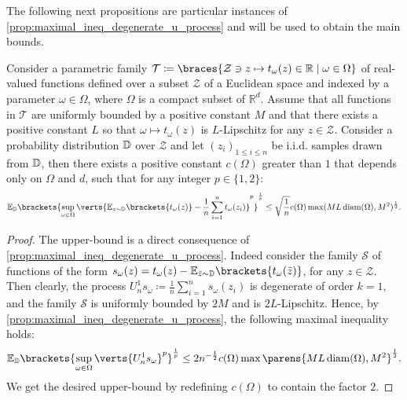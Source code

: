 The following next propositions are particular instances of \cref{prop:maximal_ineq_degenerate_u_process} and will be used to obtain the main bounds.  
\begin{proposition}\label{prop:empirical_process}
	 
	Consider a parametric family 
	$\mathcal{T}\coloneqq \braces{\mathcal{Z}\ni z\mapsto t_{\omega}(z)\in \mathbb{R}\mid\omega \in \Omega}$ 
	of real-valued functions defined over a subset $\mathcal{Z}$ of a Euclidean space and indexed by a parameter $\omega\in \Omega$, where $\Omega$ is a compact subset of $\mathbb{R}^d$. 
	Assume that all functions in $\mathcal{T}$ are uniformly bounded by a positive constant $M$ and that there exists a positive constant $L$ so that $\omega \mapsto t_{\omega}(z)$ is $L$-Lipschitz for any $z\in \mathcal{Z}$. Consider a probability distribution $\mathbb{D}$ over $\mathcal{Z}$ and let $(z_i)_{1\leq i\leq n}$ be i.i.d. samples drawn from $\mathbb{D}$, then there exists a positive constant $c(\Omega)$ greater than $1$ that depends only on $\Omega$ and $d$, such that for any integer $p \in \{1,2\}$:
	\begin{align*}
		\mathbb{E}_{\PP}\brackets{ \sup_{\omega\in \Omega} \verts{ \mathbb{E}_{z\sim \PP}\brackets{t_{\omega}(z) } - \frac{1}{n}\sum_{i=1}^n t_{\omega}(z_i) }^p }^{\frac{
		1}{p}}\leq \sqrt{\frac{1}{n}}c(\Omega)\max(ML\diam(\Omega),M^2)^{\frac{1}{2}}.
	\end{align*}
\end{proposition}
\begin{proof}
The upper-bound is a direct consequence of \cref{prop:maximal_ineq_degenerate_u_process}. Indeed consider the  family $\mathcal{S}$ of functions of the form $s_{\omega}(z) = t_{\omega}(z)-\mathbb{E}_{\bar{z}\sim\PP}\brackets{t_{\omega}(\bar{z})}$, for any $z\in\mathcal{Z}$. Then clearly, the process $U_n^1 s_{\omega}\coloneqq\frac{1}{n}\sum_{i=1}^n s_{\omega}(z_i)$ is degenerate of order $k=1$, and the family $\mathcal{S}$ is uniformly bounded by $2M$ and is $2L$-Lipschitz. Hence, by \cref{prop:maximal_ineq_degenerate_u_process}, the following maximal inequality holds:
\begin{align*}
	\mathbb{E}_{\PP}\brackets{\sup_{\omega\in \Omega} \verts{U^1_n s_{\omega}}^p}^{\frac{1}{p}}\leq 2n^{-{\frac{1}{2}}}  c(\Omega)\max\parens{ML\diam(\Omega),M^2}^{\frac{1}{2}}. 
\end{align*}
We get the desired upper-bound by redefining $c(\Omega)$ to contain the factor $2$.
\end{proof}


